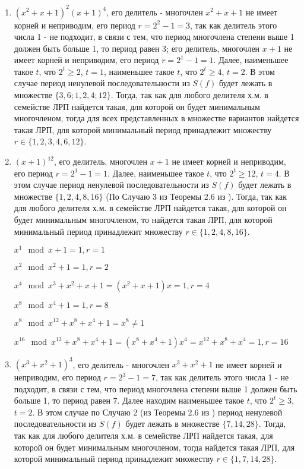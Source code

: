 \documentclass[utf8x, 14pt]{G7-32} %
\begin{document}
\begin{enumerate}
    \item $(x^2+x+1)^2(x+1)^4$, его делитель - многочлен $x^2+x+1$ не имеет корней и неприводим, его период $r = 2^2 -1 = 3$, так как делитель этого числа 1 - не подходит, в связи с тем, что период многочлена степени выше 1 должен быть больше 1, то период равен $3$; его делитель, многочлен $x+1$ не имеет корней и неприводим, его период $r = 2^1 -1 = 1$. Далее, наименьшее такое $t$, что $2^t \geq 2$, $t=1$, наименьшее такое $t$, что $2^t \geq 4$, $t=2$. В этом случае период ненулевой последовательности из $S(f)$ будет лежать в множестве $\{3, 6; 1, 2, 4; 12\}$. Тогда, так как для любого делителя х.м. в семействе ЛРП найдется такая, для которой он будет минимальным многочленом, тогда для всех представленных в множестве вариантов найдется такая ЛРП, для которой минимальный период принадлежит множеству $r \in \{1,2,3,4,6,12 \}$.
    \item $(x+1)^{12}$, его делитель, многочлен $x+1$ не имеет корней и неприводим, его период $r = 2^1 -1 = 1$. Далее, наименьшее такое $t$, что $2^t \geq 12$, $t=4$. В этом случае период ненулевой последовательности из $S(f)$ будет лежать в множестве $\{1, 2, 4, 8, 16\}$ (По Случаю 3 из Теоремы 2.6 из \cite{hse:Teoria_Gener}). Тогда, так как для любого делителя х.м. в семействе ЛРП найдется такая, для которой он будет минимальным многочленом, то найдется такая ЛРП, для которой минимальный период принадлежит множеству $r \in \{1, 2, 4, 8, 16\}$.
    
    $x^1 \mod x+1 = 1, r = 1$
    
    $x^2 \mod x^2+1 = 1, r = 2$
    
    $x^4 \mod x^3 + x^2 + x +1 = (x^2 + x + 1) x = 1, r = 4$
    
    $x^8 \mod x^4+1 = 1, r = 8$
    
    $x^8 \mod x^12 +x^8 + x^4 + 1 = x^8 \neq 1$
    
    $x^{16} \mod x^{12} +x^8 + x^4 + 1 = (x^8 + x^4 + 1) x^4 = x^{12} + x^8 + x^4 = 1, r = 16 $
    
    \item $(x^3+x^2+1)^3$, его делитель - многочлен $x^3+x^2+1$ не имеет корней и неприводим, его период $r = 2^3 -1 = 7$, так как делитель этого числа 1 - не подходит, в связи с тем, что период многочлена степени выше 1 должен быть больше 1, то период равен $7$. Далее находим наименьшее такое $t$, что $2^t \geq 3$, $t=2$. В этом случае по Случаю 2 (из Теоремы 2.6 из \cite{hse:Teoria_Gener}) период ненулевой последовательности из $S(f)$ будет лежать в множестве $\{7, 14, 28\}$. Тогда, так как для любого делителя х.м. в семействе ЛРП найдется такая, для которой он будет минимальным многочленом, тогда найдется такая ЛРП, для которой минимальный период принадлежит множеству $r \in \{1, 7, 14, 28\}$. 
    

\end{enumerate}
\end{document}
